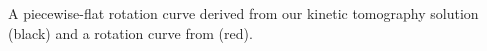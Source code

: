 \label{fig:rotation_curves}
A piecewise-flat rotation curve derived from our kinetic tomography solution (black) and a rotation curve from \citet{Clemens:1985dp} (red). 